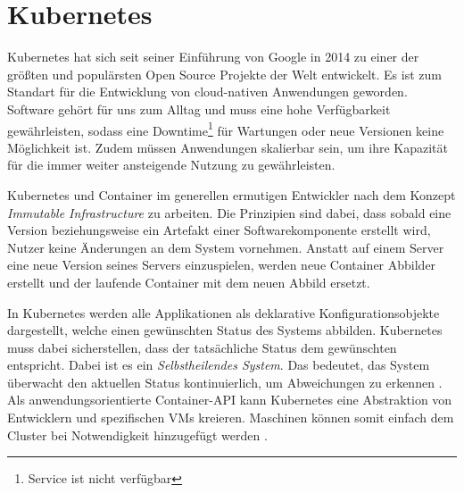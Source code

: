 \section{Kubernetes}
\label{sec:grundlagen:kubernetes}
Kubernetes hat sich seit seiner Einführung von Google in 2014 zu einer der größten und populärsten 
Open Source Projekte der Welt entwickelt. Es ist zum Standart für die Entwicklung von cloud-nativen 
Anwendungen geworden. 
Software gehört für uns zum Alltag und muss eine hohe Verfügbarkeit gewährleisten, sodass eine Downtime\footnote{Service ist nicht verfügbar}
für Wartungen oder neue Versionen keine Möglichkeit ist. 
Zudem müssen Anwendungen skalierbar sein, um ihre Kapazität für die immer weiter ansteigende Nutzung zu gewährleisten.

Kubernetes und Container im generellen ermutigen Entwickler nach dem Konzept \emph{Immutable Infrastructure} zu arbeiten.
Die Prinzipien sind dabei, dass sobald eine Version beziehungsweise ein Artefakt einer Softwarekomponente erstellt wird,
Nutzer keine Änderungen an dem System vornehmen. 
Anstatt auf einem Server eine neue Version seines Servers einzuspielen, werden neue Container Abbilder erstellt 
und der laufende Container mit dem neuen Abbild ersetzt.

In Kubernetes werden alle Applikationen als deklarative Konfigurationsobjekte dargestellt, welche einen gewünschten
Status des Systems abbilden. Kubernetes muss dabei sicherstellen, dass der tatsächliche Status dem gewünschten entspricht.
Dabei ist es ein \emph{Selbstheilendes System}.
Das bedeutet, das System überwacht den aktuellen Status kontinuierlich, um Abweichungen zu erkennen \cite{Burns2019}.
Als anwendungsorientierte Container-API kann Kubernetes eine Abstraktion von Entwicklern und spezifischen \acp{VM} kreieren.
Maschinen können somit einfach dem Cluster bei Notwendigkeit hinzugefügt werden \cite{Burns2019}.